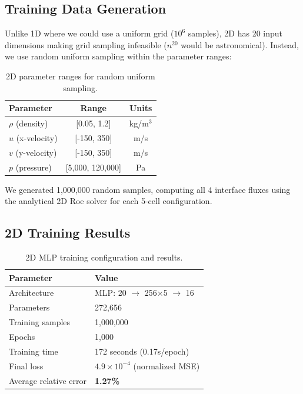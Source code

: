 \documentclass[11pt,a4paper]{article}
\begin{document}
\subsection{Training Data Generation}

Unlike 1D where we could use a uniform grid ($10^6$ samples), 2D has 20 input dimensions making grid sampling infeasible ($n^{20}$ would be astronomical). Instead, we use random uniform sampling within the parameter ranges:

\begin{table}[H]
\centering
\begin{tabular}{lcc}
\toprule
Parameter & Range & Units \\
\midrule
$\rho$ (density) & [0.05, 1.2] & kg/m$^3$ \\
$u$ (x-velocity) & [-150, 350] & m/s \\
$v$ (y-velocity) & [-150, 350] & m/s \\
$p$ (pressure) & [5,000, 120,000] & Pa \\
\bottomrule
\end{tabular}
\caption{2D parameter ranges for random uniform sampling.}
\label{tab:2d_ranges}
\end{table}

We generated 1,000,000 random samples, computing all 4 interface fluxes using the analytical 2D Roe solver for each 5-cell configuration.

\subsection{2D Training Results}

\begin{table}[H]
\centering
\begin{tabular}{ll}
\toprule
Parameter & Value \\
\midrule
Architecture & MLP: 20 $\rightarrow$ 256$\times$5 $\rightarrow$ 16 \\
Parameters & 272,656 \\
Training samples & 1,000,000 \\
Epochs & 1,000 \\
Training time & 172 seconds (0.17s/epoch) \\
Final loss & $4.9 \times 10^{-4}$ (normalized MSE) \\
Average relative error & \textbf{1.27\%} \\
\bottomrule
\end{tabular}
\caption{2D MLP training configuration and results.}
\label{tab:2d_training}
\end{table}
\end{document}
